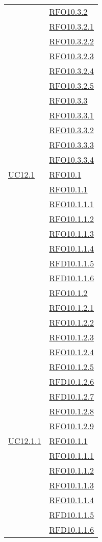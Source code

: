 \begin{longtable}{|>{\centering}m{5cm}|m{5cm}<{\centering}|}
& \hyperlink{RFO10.3.2}{RFO10.3.2}\\
& \hyperlink{RFO10.3.2.1}{RFO10.3.2.1}\\
& \hyperlink{RFO10.3.2.2}{RFO10.3.2.2}\\
& \hyperlink{RFO10.3.2.3}{RFO10.3.2.3}\\
& \hyperlink{RFO10.3.2.4}{RFO10.3.2.4}\\
& \hyperlink{RFO10.3.2.5}{RFO10.3.2.5}\\
& \hyperlink{RFO10.3.3}{RFO10.3.3}\\
& \hyperlink{RFO10.3.3.1}{RFO10.3.3.1}\\
& \hyperlink{RFO10.3.3.2}{RFO10.3.3.2}\\
& \hyperlink{RFO10.3.3.3}{RFO10.3.3.3}\\
& \hyperlink{RFO10.3.3.4}{RFO10.3.3.4}\\\hline

\hyperlink{UC12.1}{UC12.1} 
& \hyperlink{RFO10.1}{RFO10.1}\\
& \hyperlink{RFO10.1.1}{RFO10.1.1}\\
& \hyperlink{RFO10.1.1.1}{RFO10.1.1.1}\\
& \hyperlink{RFO10.1.1.2}{RFO10.1.1.2}\\
& \hyperlink{RFO10.1.1.3}{RFO10.1.1.3}\\
& \hyperlink{RFO10.1.1.4}{RFO10.1.1.4}\\
& \hyperlink{RFD10.1.1.5}{RFD10.1.1.5}\\
& \hyperlink{RFD10.1.1.6}{RFD10.1.1.6}\\
& \hyperlink{RFO10.1.2}{RFO10.1.2}\\
& \hyperlink{RFO10.1.2.1}{RFO10.1.2.1}\\
& \hyperlink{RFO10.1.2.2}{RFO10.1.2.2}\\
& \hyperlink{RFO10.1.2.3}{RFO10.1.2.3}\\
& \hyperlink{RFO10.1.2.4}{RFO10.1.2.4}\\
& \hyperlink{RFO10.1.2.5}{RFO10.1.2.5}\\
& \hyperlink{RFD10.1.2.6}{RFD10.1.2.6}\\
& \hyperlink{RFD10.1.2.7}{RFD10.1.2.7}\\
& \hyperlink{RFO10.1.2.8}{RFO10.1.2.8}\\
& \hyperlink{RFO10.1.2.9}{RFO10.1.2.9}\\\hline

\hyperlink{UC12.1.1}{UC12.1.1} 
& \hyperlink{RFO10.1.1}{RFO10.1.1}\\
& \hyperlink{RFO10.1.1.1}{RFO10.1.1.1}\\
& \hyperlink{RFO10.1.1.2}{RFO10.1.1.2}\\
& \hyperlink{RFO10.1.1.3}{RFO10.1.1.3}\\
& \hyperlink{RFO10.1.1.4}{RFO10.1.1.4}\\
& \hyperlink{RFD10.1.1.5}{RFD10.1.1.5}\\
& \hyperlink{RFD10.1.1.6}{RFD10.1.1.6}\\\hline


\end{longtable}
